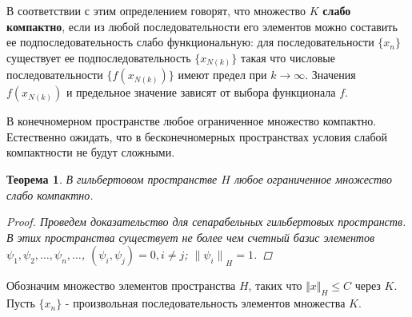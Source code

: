 \documentclass[12pt,a4paper,titlepage,oneside]{book}
\theoremstyle{definition}
\theoremstyle{plain}
\newtheorem*{theorem}{Теорема}
\theoremstyle{remark}
\theoremstyle{remark}
\theoremstyle{remark}
\theoremstyle{remark}
\theoremstyle{plain}
\theoremstyle{plain}
\begin{document}
В соответствии с этим определением говорят, что множество $K$ \textbf{слабо компактно}, если из любой последовательности его элементов можно составить ее подпоследовательность слабо функциональную: для последовательности $\{x_n\}$ существует ее подпоследовательность $\{x_{N(k)}\}$ такая что числовые последовательности $\{f(x_{N(k)})\}$ имеют предел при $k \rightarrow \infty$. Значения $f(x_{N(k)})$ и предельное значение зависят от выбора функционала $f$.

В конечномерном пространстве любое ограниченное множество компактно. Естественно ожидать, что в бесконечномерных пространствах условия слабой компактности не будут сложными.

\begin{theorem}
В гильбертовом пространстве $H$ любое ограниченное множество слабо компактно.
\begin{proof}
Проведем доказательство для сепарабельных гильбертовых пространств. В этих пространства существует не более чем счетный базис элементов $\psi_1, \psi_2, \ldots, \psi_n, \ldots$, $(\psi_i, \psi_j)=0, i\neq j$; ${\lVert \psi_i \rVert}_H=1$.
\end{proof}
\end{theorem}

Обозначим множество элементов пространства $H$, таких что ${\Vert x \Vert} _H \leqslant C$ через $K$. Пусть $\lbrace x_n \rbrace$ - произвольная последовательность элементов множества $K$.
\end{document}
